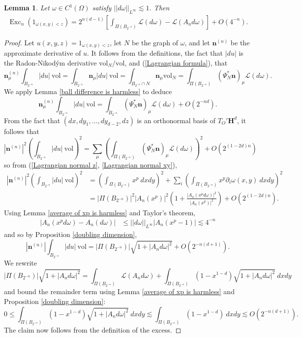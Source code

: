 \documentclass[reqno,12pt,letterpaper]{amsart}
\newcommand{\Hyp}{\mathbf H}
\DeclareMathOperator{\Exc}{Exc}
\newcommand{\Lagrange}{\mathscr L}
\newcommand{\normal}{\mathbf n}
\newcommand{\vol}{\mathrm{vol}}
\newtheorem{lemma}[theorem]{Lemma}
\theoremstyle{definition}
\numberwithin{equation}{section}
\begin{document}
\begin{lemma}\label{excess vs plateau energy}
Let $\omega \in C^1(\Omega)$ satisfy $||d\omega||_{L^\infty} \lesssim 1$. Then
\begin{align*}
    \Exc_n(1_{\omega(x, y) < z}) = 2^{n(d - 1)} \left[\int_{\Pi(B_{2^{-n}})} \Lagrange(d\omega) - \Lagrange(A_n d\omega)\right] + O(4^{-n}).
\end{align*}
\end{lemma}
\begin{proof}
Let $u(x, y, z) = 1_{\omega(x, y) < z}$, let $N$ be the graph of $\omega$, and let $\normal^{(n)}$ be the approximate derivative of $u$.
It follows from the definitions, the fact that $|du|$ is the Radon-Nikod\'ym derivative $\vol_N/\vol$, and (\ref{Lagrangian formula}), that
$$\normal^{(n)}_\mu \int_{B_{2^{-n}}} |du| ~\vol = \int_{B_{2^{-n}}} \normal_\mu |du| ~\vol = \int_{B_{2^{-n}} \cap N} \normal_\mu \vol_N = \int_{\Pi(B_{2^{-n}})} (\Psi_N^* \normal)_\mu \Lagrange(d\omega).$$
We apply Lemma \ref{ball difference is harmless} to deduce
$$\normal^{(n)}_\mu \int_{B_{2^{-n}}} |du| ~\vol = \int_{\tilde B_{2^{-n}}} (\Psi_N^* \normal)_\mu \Lagrange(d\omega) + O(2^{-nd}).$$
From the fact that $(dx, dy_1, \dots, dy_{d - 2}, dz)$ is an orthonormal basis of $T_O' \Hyp^d$, it follows that
$$|\normal^{(n)}|^2 \left(\int_{B_{2^{-n}}} |du| ~\vol\right)^2 = \sum_\mu \left(\int_{\Pi(B_{2^{-n}})} (\Psi_N^* \normal)_\mu \Lagrange(d\omega)\right)^2 + O(2^{(1 - 2d)n})$$
so from (\ref{Lagrangian normal z}, \ref{Lagrangian normal xy}),
\begin{align*}
    |\normal^{(n)}|^2 \left(\int_{B_{2^{-n}}} |du| ~\vol\right)^2 &= \left(\int_{\Pi(B_{2^{-n}})} x^p ~dxdy\right)^2 + \sum_i \left(\int_{\Pi(B_{2^{-n}})} x^p \partial_i \omega(x, y) ~dxdy \right)^2 \\
    &= |\Pi(B_{2^{-n}})|^2 |A_n (x^p)|^2 \left(1 + \frac{|A_n(x^p d\omega)|^2}{|A_n (x^p)|^2}\right) + O(2^{(1 - 2d)n}).
\end{align*}
Using Lemma \ref{average of xp is harmless} and Taylor's theorem,
\begin{align*}
    |A_n(x^p d\omega) - A_n (d\omega)| &\leq ||d\omega||_{L^\infty} |A_n (x^p - 1)| \lesssim 4^{-n}
\end{align*}
and so by Proposition \ref{doubling dimension},
$$|\normal^{(n)}| \int_{B_{2^{-n}}} |du| ~\vol = |\Pi(B_{2^{-n}})| \sqrt{1 + |A_n d\omega|^2} + O(2^{-n(d + 1)}).$$
We rewrite
$$|\Pi(B_{2^{-n}})| \sqrt{1 + |A_n d\omega|^2} = \int_{\Pi(B_{2^{-n}})} \Lagrange(A_nd\omega) + \int_{\Pi(B_{2^{-n}})} (1 - x^{1 - d})\sqrt{1 + |A_n d\omega|^2} ~dxdy$$
and bound the remainder term using Lemma \ref{average of xp is harmless} and Proposition \ref{doubling dimension}:
$$0 \leq \int_{\Pi(B_{2^{-n}})} (1 - x^{1 - d})\sqrt{1 + |A_n d\omega|^2} ~dxdy \lesssim \int_{\Pi(B_{2^{-n}})} (1 - x^{1-d}) ~dxdy \lesssim O(2^{-n(d + 1)}).$$
The claim now follows from the definition of the excess.
\end{proof}
\end{document}
